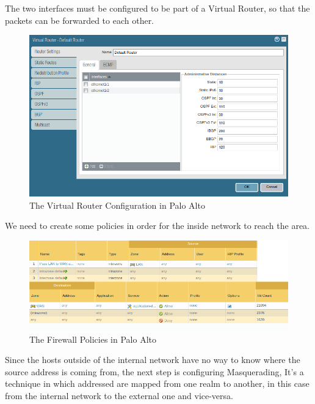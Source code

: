 The two interfaces must be configured to be part of a Virtual Router, so that the packets can be forwarded to each other.

\begin{figure}[!hb]
 \centering
 \includegraphics[width=13cm]{img/virtual_router.png}
 \caption{The Virtual Router Configuration in Palo Alto }
 \label{Virtual Router Configuration}
\end{figure}


We need to create some policies in order for the inside network to reach the  area.

\begin{figure}[!hb]
 \centering
 \includegraphics[width=13cm]{img/Firewall_Policy.png}
 \caption{The Firewall Policies in Palo Alto }
 \label{Firewall Policies}
\end{figure}


Since the hosts outside of the internal network have no way to know where the source address is coming from, the next step is configuring  Masquerading, It's a technique in which  addressed are mapped from one realm to another, in this case from the internal network to the external one and vice-versa\cite{rfc2663}.

